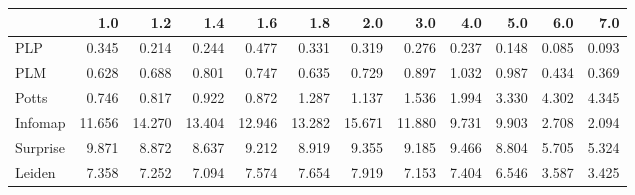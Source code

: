 \begin{tabular}{lrrrrrrrrrrr}
\toprule
{} &    1.0 &    1.2 &    1.4 &    1.6 &    1.8 &    2.0 &    3.0 &   4.0 &   5.0 &   6.0 &   7.0 \\
\midrule
PLP      &  0.345 &  0.214 &  0.244 &  0.477 &  0.331 &  0.319 &  0.276 & 0.237 & 0.148 & 0.085 & 0.093 \\
PLM      &  0.628 &  0.688 &  0.801 &  0.747 &  0.635 &  0.729 &  0.897 & 1.032 & 0.987 & 0.434 & 0.369 \\
Potts    &  0.746 &  0.817 &  0.922 &  0.872 &  1.287 &  1.137 &  1.536 & 1.994 & 3.330 & 4.302 & 4.345 \\
Infomap  & 11.656 & 14.270 & 13.404 & 12.946 & 13.282 & 15.671 & 11.880 & 9.731 & 9.903 & 2.708 & 2.094 \\
Surprise &  9.871 &  8.872 &  8.637 &  9.212 &  8.919 &  9.355 &  9.185 & 9.466 & 8.804 & 5.705 & 5.324 \\
Leiden   &  7.358 &  7.252 &  7.094 &  7.574 &  7.654 &  7.919 &  7.153 & 7.404 & 6.546 & 3.587 & 3.425 \\
\bottomrule
\end{tabular}
